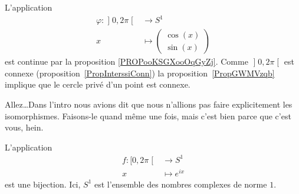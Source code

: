\begin{example} \label{EXooJFDPooBZADKs}
	L'application
	\begin{equation}
		\begin{aligned}
			\varphi\colon \mathopen] 0 , 2\pi \mathclose[ & \to S^1                            \\
			x                                             & \mapsto \begin{pmatrix}
				\cos(x) \\
				\sin(x)
			\end{pmatrix}
		\end{aligned}
	\end{equation}
	est continue par la proposition \ref{PROPooKSGXooOqGyZj}. Comme \( \mathopen] 0 , 2\pi \mathclose[\) est connexe (proposition~\ref{PropInterssiConn}) la proposition~\ref{PropGWMVzqb} implique que le cercle privé d'un point est connexe.
\end{example}


Allez\ldots Dans l'intro nous avions dit que nous n'allions pas faire explicitement les isomorphismes. Faisons-le quand même une fois, mais c'est bien parce que c'est vous, hein.
\begin{proposition}     \label{PROPooZEFEooEKMOPT}
	L'application
	\begin{equation}
		\begin{aligned}
			f\colon \mathopen[ 0 , 2\pi \mathclose[ & \to S^1         \\
			x                                       & \mapsto  e^{ix}
		\end{aligned}
	\end{equation}
	est une bijection. Ici, \( S^1\) est l'ensemble des nombres complexes de norme \( 1\).
\end{proposition}

